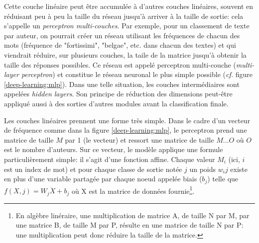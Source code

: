 Cette couche linéaire peut être accumulée à d'autres couches linéaires, souvent en réduisant peu à peu la taille du réseau jusqu'à arriver à la taille de sortie: cela s'appelle un \textit{perceptron multi-couches}. Par exemple, pour un classement de texte par auteur, on pourrait créer un réseau utilisant les fréquences de chacun des mots (fréquence de "fortissimi", "belgae", etc. dans chacun des textes) et qui viendrait réduire, sur plusieurs couches, la taile de la matrice jusqu'à obtenir la taille des réponses possibles. Ce réseau est appelé perceptron multi-couche (\textit{multi-layer perceptron}) et constitue le réseau neuronal le plus simple possible (\textit{cf.} figure \ref{deep-learning:mlp}). Dans une telle situation, les couches intermédiaires sont appelées \textit{hidden layers}. Son principe de réduction des dimensions peut-être appliqué aussi à des sorties d'autres modules avant la classification finale.

Les couches linéaires prennent une forme très simple. Dans le cadre d'un vecteur de fréquence comme dans la figure \ref{deep-learning:mlp}, le perceptron prend une matrice de taille $M$ par 1 (le vecteur) et ressort une matrice de taille $M...O$ où $O$ est le nombre d'auteurs. Sur ce vecteur, le modèle applique une formule particulièrement simple: il s'agit d'une fonction affine. Chaque valeur $M_{i}$ (ici, $i$ est un index de mot) et pour chaque classe de sortie notée $j$  un poids $w_{i}{j}$ existe en plus d'une variable partagée par chaque noeud appelée biais ($b_{j}$) telle que $f(X, j) = W_{j} \dot X + b_{j}$  où X est la matrice de données fournie\footnote{En algèbre linéraire, une multiplication de matrice A, de taille N par M, par une matrice B, de taille M par P, résulte en une matrice de taille N par P: une multiplication peut donc réduire la taille de la matrice.}.

